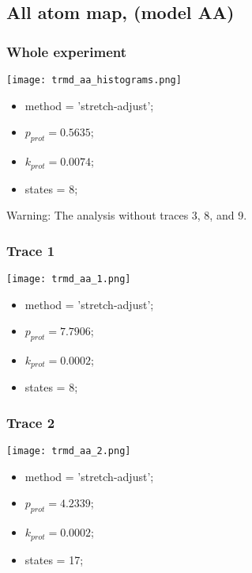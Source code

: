 \subsection{All atom map, (model AA)}
\subsubsection{Whole experiment}
\begin{minipage}[c]{0.7\textwidth}
	\texttt{[image: trmd\_aa\_histograms.png]}
\end{minipage}
\hfill
\begin{minipage}[c]{0.45\textwidth}
    \begin{itemize}
        \item method = 'stretch-adjust';
        \item $p_{prot}=0.5635$;
        \item $k_{prot}=0.0074$;
        \item states = 8;
    \end{itemize}
\end{minipage}

Warning: The analysis without traces 3, 8, and 9.

\subsubsection{Trace 1}
\begin{minipage}[c]{0.7\textwidth}
    \texttt{[image: trmd\_aa\_1.png]}
\end{minipage}
\hfill
\begin{minipage}[c]{0.45\textwidth}
    \begin{itemize}
        \item method = 'stretch-adjust';
        \item $p_{prot}=7.7906$;
        \item $k_{prot}=0.0002$;
        \item states = 8;
    \end{itemize}
\end{minipage}

\subsubsection{Trace 2}
\begin{minipage}[c]{0.7\textwidth}
    \texttt{[image: trmd\_aa\_2.png]}
\end{minipage}
\hfill
\begin{minipage}[c]{0.45\textwidth}
    \begin{itemize}
        \item method = 'stretch-adjust';
        \item $p_{prot}=4.2339$;
        \item $k_{prot}=0.0002$;
        \item states = 17;
    \end{itemize}
\end{minipage}

